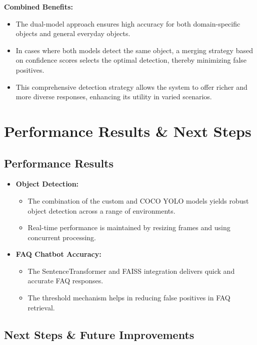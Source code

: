 \documentclass[12pt]{article}
\begin{document}
\textbf{Combined Benefits:}
\begin{itemize}
    \item The dual-model approach ensures high accuracy for both domain-specific objects and general everyday objects.
    \item In cases where both models detect the same object, a merging strategy based on confidence scores selects the optimal detection, thereby minimizing false positives.
    \item This comprehensive detection strategy allows the system to offer richer and more diverse responses, enhancing its utility in varied scenarios.
\end{itemize}

\section{Performance Results \& Next Steps}

\subsection{Performance Results}

\begin{itemize}
    \item \textbf{Object Detection:}
    \begin{itemize}
        \item The combination of the custom and COCO YOLO models yields robust object detection across a range of environments.
        \item Real-time performance is maintained by resizing frames and using concurrent processing.
    \end{itemize}
    \item \textbf{FAQ Chatbot Accuracy:}
    \begin{itemize}
        \item The SentenceTransformer and FAISS integration delivers quick and accurate FAQ responses.
        \item The threshold mechanism helps in reducing false positives in FAQ retrieval.
    \end{itemize}
\end{itemize}

\subsection{Next Steps \& Future Improvements}
\end{document}
